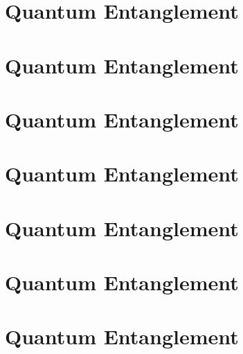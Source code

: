 \documentclass[]{article}
\begin{document}
\section{Quantum Entanglement}

\section{Quantum Entanglement}

\section{Quantum Entanglement}

\section{Quantum Entanglement}

\section{Quantum Entanglement}

\section{Quantum Entanglement}

\section{Quantum Entanglement}


\raggedright

\end{document}
